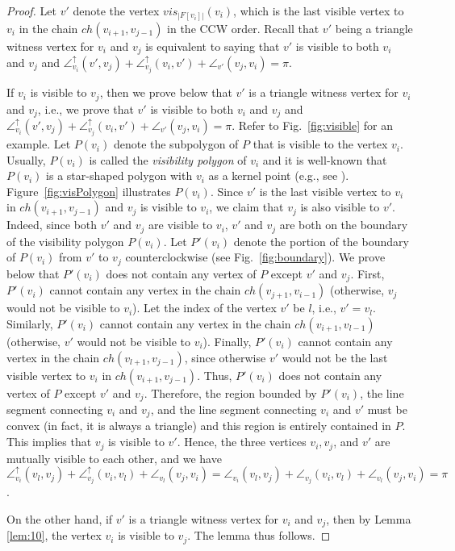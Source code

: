 \documentclass[11pt]{article}
\def\sangle{\angle^{\uparrow}}
\begin{document}
\begin{proof}
Let $v'$ denote the vertex $vis_{|F[v_i]|}(v_i)$, which is the last visible vertex
to $v_i$ in the chain $ch(v_{i+1},v_{j-1})$ in the CCW order.
Recall that $v'$ being a triangle witness vertex for $v_i$ and $v_j$
is equivalent to saying that $v'$ is visible to both $v_i$ and $v_j$ and 
$\sangle_{v_i}(v',v_j)+\sangle_{v_j}(v_i,v')+\angle_{v'}(v_j,v_i)=\pi$. 


If $v_i$ is visible to $v_j$, then we prove below that $v'$ is a triangle
witness vertex for $v_i$ and $v_j$, i.e., we prove that $v'$ is visible to both $v_i$ and
$v_j$ and
$\sangle_{v_i}(v',v_j)+\sangle_{v_j}(v_i,v')+\angle_{v'}(v_j,v_i)=\pi$. 
Refer to Fig.~\ref{fig:visible} for an example. 
Let $P(v_i)$ denote the subpolygon of $P$ that is visible to
the vertex $v_i$. Usually, $P(v_i)$ is called the {\em visibility
polygon} of $v_i$ and it is well-known that $P(v_i)$ is
a star-shaped polygon with $v_i$ as a kernel point
(e.g., see \cite{ref:AsanoVi00}). Figure~\ref{fig:visPolygon}
illustrates $P(v_i)$.
Since $v'$ is the last visible vertex to $v_i$ in
$ch(v_{i+1},v_{j-1})$ and $v_j$ is visible to $v_i$, we claim that
$v_j$ is also visible to $v'$. Indeed, since both $v'$ and $v_j$ are visible to $v_i$, $v'$
and $v_j$ are both on the boundary of the visibility polygon $P(v_i)$.  
Let $P'(v_i)$ denote the portion of the boundary of $P(v_i)$ from $v'$ to
$v_j$ counterclockwise (see Fig.~\ref{fig:boundary}). 
We prove below that $P'(v_i)$ does not contain
any vertex of $P$ except $v'$ and $v_j$.
First, $P'(v_i)$ cannot contain any vertex in the chain
$ch(v_{j+1},v_{i-1})$ (otherwise, $v_j$ would not be visible to
$v_i$). Let the index of the vertex $v'$ be $l$, i.e.,
$v'= v_l$. Similarly, $P'(v_i)$ cannot contain any vertex in the chain
$ch(v_{i+1},v_{l-1})$ (otherwise, $v'$ would not be visible to
$v_i$). Finally, $P'(v_i)$ cannot contain any vertex in the chain
$ch(v_{l+1},v_{j-1})$, since otherwise $v'$ would not be the last
visible vertex to $v_i$ in $ch(v_{i+1},v_{j-1})$. Thus, $P'(v_i)$ does
not contain any vertex of $P$ except $v'$ and $v_j$. Therefore, the
region bounded by $P'(v_i)$, the line segment connecting $v_i$ and
$v_j$, and the line segment connecting $v_i$ and $v'$ must be convex (in fact,
it is always a triangle) and this region is entirely contained in $P$.  This
implies that $v_j$ is visible to $v'$. 
Hence, the three vertices $v_i,v_j$, and $v'$ are mutually visible to each
other, and we have 
$\sangle_{v_i}(v_l,v_j)+\sangle_{v_j}(v_i,v_l)+\angle_{v_l}(v_j,v_i)=
\angle_{v_i}(v_l,v_j)+\angle_{v_j}(v_i,v_l)+\angle_{v_l}(v_j,v_i)=\pi$. 

On the other hand, if $v'$ is a triangle witness vertex 
for $v_i$ and $v_j$, then by Lemma
\ref{lem:10}, the vertex $v_i$ is visible to $v_j$. The lemma thus
follows.  
\end{proof}
\end{document}
